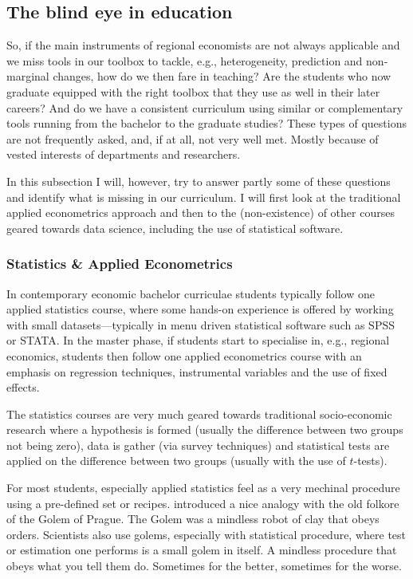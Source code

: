 \documentclass[fleqn,10pt]{SelfArx} %
\begin{document}
\subsection{The blind eye in education}

So, if the main instruments of regional economists are not always applicable and
we miss tools in our toolbox to tackle, e.g., heterogeneity, prediction and
non-marginal changes, how do we then fare in teaching? Are the students who now
graduate equipped with the right toolbox that they use as well in their later
careers? And do we have a consistent curriculum using similar or complementary
tools running from the bachelor to the graduate studies? These types of
questions are not frequently asked, and, if at all, not very well met. Mostly
because of vested interests of departments and researchers.

In this subsection I will, however, try to answer partly some of these questions
and identify what is missing in our curriculum. I will first look at the
traditional applied econometrics approach and then to the (non-existence) of
other courses geared towards data science, including the use of statistical software.

\subsubsection{Statistics \& Applied Econometrics}

In contemporary economic bachelor curriculae students typically follow one
applied statistics course, where some hands-on experience is offered by working
with small datasets---typically in menu driven statistical software such as SPSS
or STATA. In the master phase, if students start to specialise in, e.g.,
regional economics, students then follow one applied econometrics
course with an emphasis on regression techniques, instrumental variables and the
use of fixed effects.

The statistics courses are very much geared towards traditional socio-economic
research where a hypothesis is formed (usually the difference between two groups
not being zero), data is gather (via survey techniques) and statistical tests
are applied on the difference between two groups (usually with the use of
$t$-tests).

For most students, especially applied statistics feel as a very mechinal
procedure using a pre-defined set or recipes. \citet{mcelreath2016statistical}
introduced a nice analogy with the old folkore of the Golem of Prague. The
Golem was a mindless robot of clay that obeys orders. Scientists also use
golems, especially with statistical procedure, where test or estimation one
performs is a small golem in itself. A mindless procedure that obeys what you
tell them do. Sometimes for the better, sometimes for the worse. 
\end{document}
